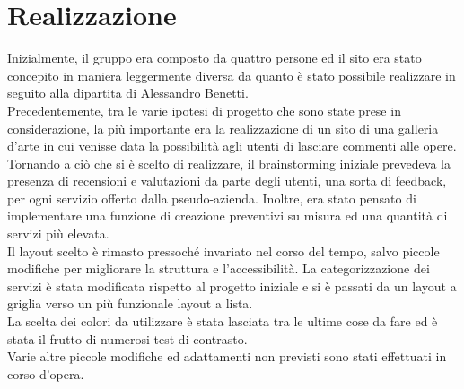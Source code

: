 \documentclass[a4paper]{article}
\begin{document}
\section{Realizzazione}
Inizialmente, il gruppo era composto da quattro persone ed il sito era stato concepito in maniera leggermente diversa da quanto è stato possibile realizzare in seguito alla dipartita di Alessandro Benetti. \\
Precedentemente, tra le varie ipotesi di progetto che sono state prese in considerazione, la più importante era la realizzazione di un sito di una galleria d'arte in cui venisse data la possibilità agli utenti di lasciare commenti alle opere. \\
Tornando a ciò che si è scelto di realizzare, il brainstorming iniziale prevedeva la presenza di recensioni e valutazioni da parte degli utenti, una sorta di feedback, per ogni servizio offerto dalla pseudo-azienda. Inoltre, era stato pensato di implementare una funzione di creazione preventivi su misura ed una quantità di servizi più elevata.\\
Il layout scelto è rimasto pressoché invariato nel corso del tempo, salvo piccole modifiche per migliorare la struttura e l'accessibilità. La categorizzazione dei servizi è stata modificata rispetto al progetto iniziale e si è passati da un layout a griglia verso un più funzionale layout a lista.\\
La scelta dei colori da utilizzare è stata lasciata tra le ultime cose da fare ed è stata il frutto di numerosi test di contrasto. \\
Varie altre piccole modifiche ed adattamenti non previsti sono stati effettuati in corso d'opera.
\end{document}
